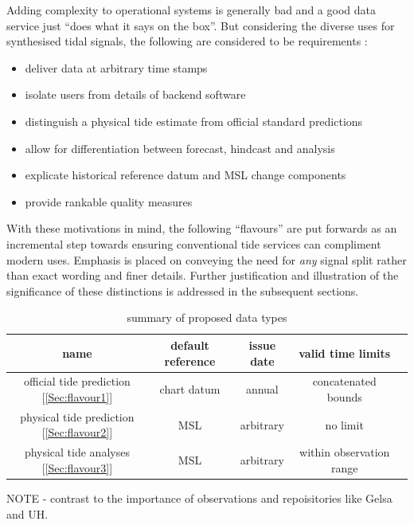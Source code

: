 Adding complexity to operational systems is generally bad and a good data service just ``does what it says on the box''.  But considering the diverse uses for synthesised tidal signals, the following are considered to be requirements : 
\begin{itemize}
    \item deliver data at arbitrary time stamps
    \item isolate users from details of backend software 
    \item distinguish a physical tide estimate from official standard predictions
    \item allow for differentiation between forecast, hindcast and analysis
    \item explicate historical reference datum and MSL change components
    \item provide rankable quality measures
\end{itemize}

With these motivations in mind, the following ``flavours'' are put forwards as an incremental step towards ensuring conventional tide services can compliment modern uses.   Emphasis is placed on conveying the need for \textit{any} signal split rather than exact wording and finer details.
Further justification and illustration of the significance of these distinctions is addressed in the subsequent sections.

\begin{table}[H]\centering
    \begin{tabular}{ |c|c|c|c|c| }
    \hline
    name    & 
        default reference  & 
        issue date         & 
        valid time limits  \\
    \hline
    official tide prediction [\ref{Sec:flavour1}] & 
        chart datum & annual & 
        concatenated bounds\\
    \hline
    physical tide prediction [\ref{Sec:flavour2}]& 
        MSL       & 
        arbitrary & 
        no limit \\
    \hline
    physical tide analyses [\ref{Sec:flavour3}]& 
        MSL       & 
        arbitrary & 
        within observation range \\
    \hline
    \end{tabular}
    \caption{summary of proposed data types}
    \label{tab:typesSummary}
\end{table}

NOTE - contrast to the importance of observations and repoisitories like Gelsa and UH.

